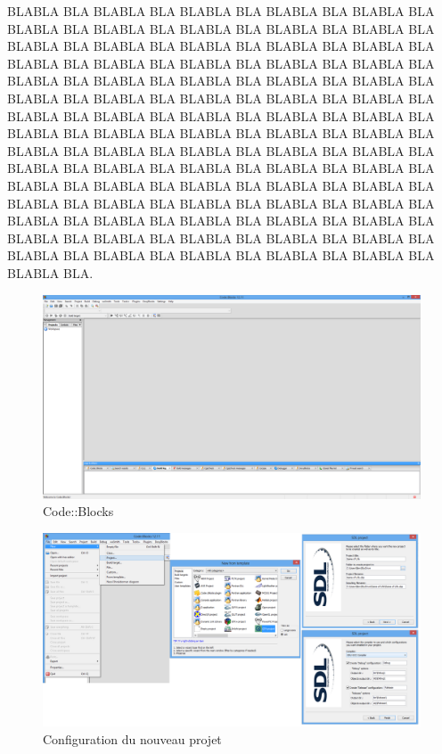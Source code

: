 \documentclass[a4paper, 12pt]{article}
\begin{document}
\begin{doublespace}
BLABLA BLA BLABLA BLA BLABLA BLA BLABLA BLA BLABLA BLA BLABLA BLA BLABLA BLA BLABLA BLA BLABLA BLA BLABLA BLA BLABLA BLA BLABLA BLA BLABLA BLA BLABLA BLA BLABLA BLA BLABLA BLA BLABLA BLA BLABLA BLA BLABLA BLA BLABLA BLA BLABLA BLA BLABLA BLA BLABLA BLA BLABLA BLA BLABLA BLA BLABLA BLA BLABLA BLA BLABLA BLA BLABLA BLA BLABLA BLA BLABLA BLA BLABLA BLA BLABLA BLA BLABLA BLA BLABLA BLA BLABLA BLA BLABLA BLA BLABLA BLA BLABLA BLA BLABLA BLA BLABLA BLA BLABLA BLA BLABLA BLA BLABLA BLA BLABLA BLA BLABLA BLA BLABLA BLA BLABLA BLA BLABLA BLA BLABLA BLA BLABLA BLA BLABLA BLA BLABLA BLA BLABLA BLA BLABLA BLA BLABLA BLA BLABLA BLA BLABLA BLA BLABLA BLA BLABLA BLA BLABLA BLA BLABLA BLA BLABLA BLA BLABLA BLA BLABLA BLA BLABLA BLA BLABLA BLA BLABLA BLA BLABLA BLA BLABLA BLA BLABLA BLA BLABLA BLA BLABLA BLA BLABLA BLA BLABLA BLA BLABLA BLA.

\newpage \def\refname{Bibliographie}    

\clearpage \listoffigures {} 
\clearpage
\begin{figure}
\includegraphics[scale=0.3]{./images/cb01.png}
\caption{Code::Blocks}				
\label{cb01}				
\end{figure}

\begin{figure}
\includegraphics[scale=0.35]{./images/cb02.png}
\caption{Configuration du nouveau projet}				
\label{cb02}				
\end{figure}


\end{doublespace}
\end{document}
